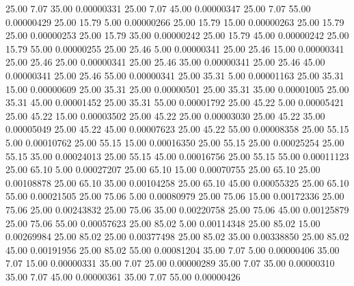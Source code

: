      25.00      7.07     35.00     0.00000331
     25.00      7.07     45.00     0.00000347
     25.00      7.07     55.00     0.00000429
     25.00     15.79      5.00     0.00000266
     25.00     15.79     15.00     0.00000263
     25.00     15.79     25.00     0.00000253
     25.00     15.79     35.00     0.00000242
     25.00     15.79     45.00     0.00000242
     25.00     15.79     55.00     0.00000255
     25.00     25.46      5.00     0.00000341
     25.00     25.46     15.00     0.00000341
     25.00     25.46     25.00     0.00000341
     25.00     25.46     35.00     0.00000341
     25.00     25.46     45.00     0.00000341
     25.00     25.46     55.00     0.00000341
     25.00     35.31      5.00     0.00001163
     25.00     35.31     15.00     0.00000609
     25.00     35.31     25.00     0.00000501
     25.00     35.31     35.00     0.00001005
     25.00     35.31     45.00     0.00001452
     25.00     35.31     55.00     0.00001792
     25.00     45.22      5.00     0.00005421
     25.00     45.22     15.00     0.00003502
     25.00     45.22     25.00     0.00003030
     25.00     45.22     35.00     0.00005049
     25.00     45.22     45.00     0.00007623
     25.00     45.22     55.00     0.00008358
     25.00     55.15      5.00     0.00010762
     25.00     55.15     15.00     0.00016350
     25.00     55.15     25.00     0.00025254
     25.00     55.15     35.00     0.00024013
     25.00     55.15     45.00     0.00016756
     25.00     55.15     55.00     0.00011123
     25.00     65.10      5.00     0.00027207
     25.00     65.10     15.00     0.00070755
     25.00     65.10     25.00     0.00108878
     25.00     65.10     35.00     0.00104258
     25.00     65.10     45.00     0.00055325
     25.00     65.10     55.00     0.00021505
     25.00     75.06      5.00     0.00080979
     25.00     75.06     15.00     0.00172336
     25.00     75.06     25.00     0.00243832
     25.00     75.06     35.00     0.00220758
     25.00     75.06     45.00     0.00125879
     25.00     75.06     55.00     0.00057623
     25.00     85.02      5.00     0.00114348
     25.00     85.02     15.00     0.00269984
     25.00     85.02     25.00     0.00377498
     25.00     85.02     35.00     0.00338850
     25.00     85.02     45.00     0.00191956
     25.00     85.02     55.00     0.00081204
     35.00      7.07      5.00     0.00000406
     35.00      7.07     15.00     0.00000331
     35.00      7.07     25.00     0.00000289
     35.00      7.07     35.00     0.00000310
     35.00      7.07     45.00     0.00000361
     35.00      7.07     55.00     0.00000426
